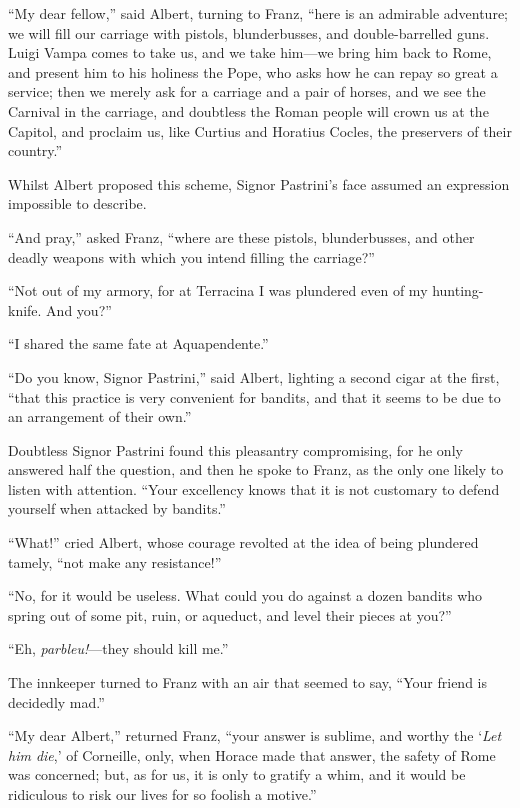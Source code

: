 “My dear fellow,” said Albert, turning to Franz, “here is an admirable
adventure; we will fill our carriage with pistols, blunderbusses, and
double-barrelled guns. Luigi Vampa comes to take us, and we take him—we
bring him back to Rome, and present him to his holiness the Pope, who
asks how he can repay so great a service; then we merely ask for a
carriage and a pair of horses, and we see the Carnival in the carriage,
and doubtless the Roman people will crown us at the Capitol, and
proclaim us, like Curtius and Horatius Cocles, the preservers of their
country.”

Whilst Albert proposed this scheme, Signor Pastrini’s face assumed an
expression impossible to describe.

“And pray,” asked Franz, “where are these pistols, blunderbusses, and
other deadly weapons with which you intend filling the carriage?”

“Not out of my armory, for at Terracina I was plundered even of my
hunting-knife. And you?”

“I shared the same fate at Aquapendente.”

“Do you know, Signor Pastrini,” said Albert, lighting a second cigar at
the first, “that this practice is very convenient for bandits, and that
it seems to be due to an arrangement of their own.”

Doubtless Signor Pastrini found this pleasantry compromising, for he
only answered half the question, and then he spoke to Franz, as the
only one likely to listen with attention. “Your excellency knows that
it is not customary to defend yourself when attacked by bandits.”

“What!” cried Albert, whose courage revolted at the idea of being
plundered tamely, “not make any resistance!”

“No, for it would be useless. What could you do against a dozen bandits
who spring out of some pit, ruin, or aqueduct, and level their pieces
at you?”

“Eh, \textit{parbleu!}—they should kill me.”

The innkeeper turned to Franz with an air that seemed to say, “Your
friend is decidedly mad.”

“My dear Albert,” returned Franz, “your answer is sublime, and worthy
the ‘\textit{Let him die},’ of Corneille, only, when Horace made that answer,
the safety of Rome was concerned; but, as for us, it is only to gratify
a whim, and it would be ridiculous to risk our lives for so foolish a
motive.”

